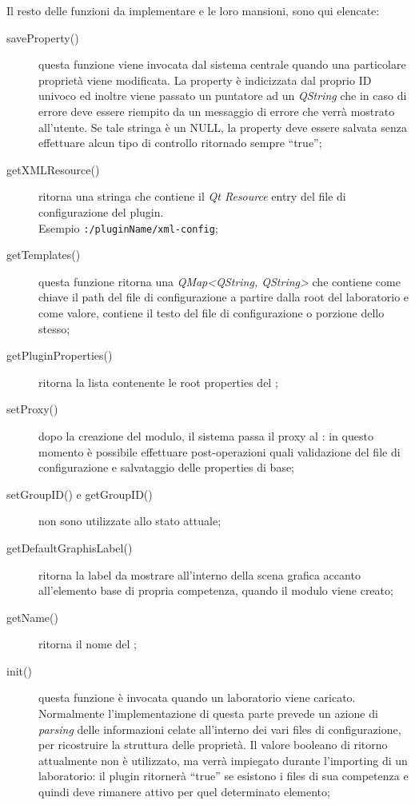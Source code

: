 Il resto delle funzioni da implementare e le loro mansioni, sono qui elencate:
\begin{description}
\item[saveProperty()] questa funzione viene invocata dal sistema centrale quando una particolare proprietà viene modificata. La property è indicizzata dal proprio ID univoco ed inoltre viene passato un puntatore ad un \emph{QString} che in caso di errore deve essere riempito da un messaggio di errore che verrà mostrato all'utente. Se tale stringa è un NULL, la property deve essere salvata senza effettuare alcun tipo di controllo ritornado sempre ``true'';

\item[getXMLResource()] ritorna una stringa che contiene il \emph{Qt Resource} entry del file di configurazione del plugin. \\
Esempio \texttt{:/pluginName/xml-config};

\item[getTemplates()] questa funzione ritorna una \emph{QMap<QString, QString>} che contiene come chiave il path del file di configurazione a partire dalla root del laboratorio e come valore, contiene il testo del file di configurazione o porzione dello stesso;

\item[getPluginProperties()] ritorna la lista contenente le root properties del \plugin{};

\item[setProxy()] dopo la creazione del modulo, il sistema passa il proxy al \plugin{}: in questo momento è possibile effettuare post-operazioni quali validazione del file \xml{} di configurazione e salvataggio delle properties di base; 

\item[setGroupID() e getGroupID()] non sono utilizzate allo stato attuale;

\item[getDefaultGraphisLabel()] ritorna la label da mostrare all'interno della scena grafica accanto all'elemento base di propria competenza, quando il modulo viene creato;

\item[getName()] ritorna il nome del \plugin{};

\item[init()] questa funzione è invocata quando un laboratorio viene caricato. Normalmente l'implementazione di questa parte prevede un azione di \emph{parsing} delle informazioni celate all'interno dei vari files di configurazione, per ricostruire la struttura delle proprietà. Il valore booleano di ritorno attualmente non è utilizzato, ma verrà impiegato durante l'importing di un laboratorio: il plugin ritornerà ``true'' se esistono i files di sua competenza e quindi deve rimanere attivo per quel determinato elemento;


\end{description}
